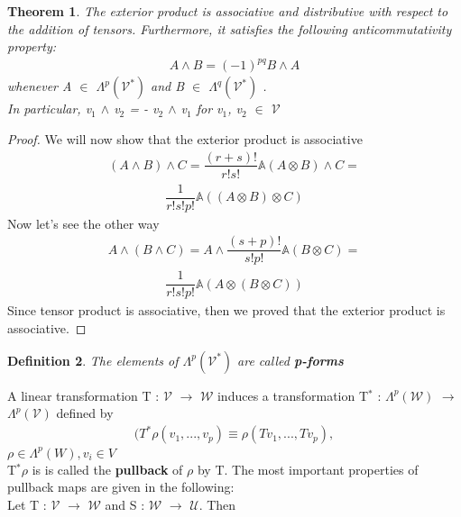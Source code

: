 \documentclass[12pt,a4paper]{article}
\newtheorem{thm}{Theorem}
\newtheorem{defn}[thm]{Definition}
\begin{document}
\begin{thm}
The exterior product is associative and distributive
with respect to the addition of tensors. Furthermore, it satisfies the
following anticommutativity property:
\begin{align*}
A \wedge B = (-1)^{pq}B\wedge A
\end{align*}
whenever A $\in$ $\Lambda^{p} (\mathcal{V}^*)$ and B $\in$ $\Lambda^{q} (\mathcal{V}^*)$ .  \\In particular, v$_1$ $\wedge$ v$_2$ =
   - v$_2$ $\wedge$ v$_1$ for v$_1$, v$_2$ $\in$ $\mathcal{V}$
\end{thm}

\begin{proof}
We will now show that the exterior product is associative
\begin{align*}
(A \wedge B) \wedge C = \dfrac{(r+s)!}{r!s!}\mathbb{A}(A \otimes B ) \wedge C =
\end{align*}
\begin{align*}
 \dfrac{1}{r!s!p!}\mathbb{A}((A \otimes B ) \otimes C)
\end{align*}
Now let's see the other way
\begin{align*}
A \wedge ( B \wedge C) =  A \wedge \dfrac{(s+p)!}{s!p!}\mathbb{A}(B \otimes C )   =
\end{align*}
\begin{align*}
 \dfrac{1}{r!s!p!}\mathbb{A}(A \otimes (B  \otimes C))
\end{align*}
Since tensor product is associative, then we proved that the exterior product is associative.
\end{proof}
\begin{defn}
The elements of $\Lambda^{p} (\mathcal{V}^*)$ are called \textbf{p-forms} 
\end{defn}
A linear transformation T : $\mathcal{V}$ $\to$ $\mathcal{W}$ induces a transformation T$^*$ : $\Lambda^{p} (\mathcal{W})$  $\to$ $\Lambda^{p} (\mathcal{V})$ defined by
\begin{align*}
(T^{*} \rho (v_1,...,v_p) \equiv \rho (T v_1,...,T v_p) , 
\end{align*}
$\rho \in \Lambda^{p}(W), v_i \in V$
\\
T$^*\rho$ is is called the \textbf{pullback } of $\rho$ by T. The most important properties of
pullback maps are given in the following:\\
Let T : $\mathcal{V}$ $\to$ $\mathcal{W}$ and  S : $\mathcal{W}$ $\to$ $\mathcal{U}$. Then\\
\\
\end{document}
